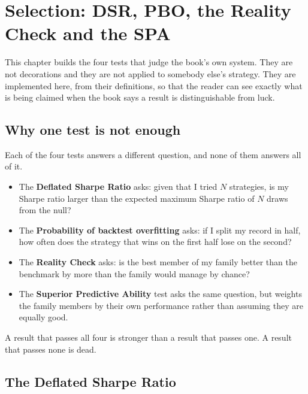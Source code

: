
\chapter{Selection: DSR, PBO, the Reality Check and the SPA}
\label{ch:selection}

This chapter builds the four tests that judge the book's own system. They
are not decorations and they are not applied to somebody else's strategy.
They are implemented here, from their definitions, so that the reader can
see exactly what is being claimed when the book says a result is
distinguishable from luck.

\section{Why one test is not enough}

Each of the four tests answers a different question, and none of them
answers all of it.

\begin{itemize}
\item The \textbf{Deflated Sharpe Ratio} asks: given that I tried \(N\)
strategies, is my Sharpe ratio larger than the expected maximum Sharpe
ratio of \(N\) draws from the null?
\item The \textbf{Probability of backtest overfitting} asks: if I split my
record in half, how often does the strategy that wins on the first half
lose on the second?
\item The \textbf{Reality Check} asks: is the best member of my family
better than the benchmark by more than the family would manage by chance?
\item The \textbf{Superior Predictive Ability} test asks the same
question, but weights the family members by their own performance rather
than assuming they are equally good.
\end{itemize}

A result that passes all four is stronger than a result that passes one.
A result that passes none is dead.

\section{The Deflated Sharpe Ratio}

